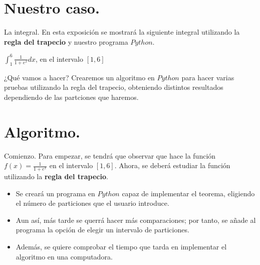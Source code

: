 \documentclass{beamer}
\begin{document}
  \section{Nuestro caso.}
  \begin{frame}
    \begin{block}{La integral.}
      En esta exposición se mostrará la siguiente integral utilizando la \textbf{regla del trapecio} y nuestro programa $Python$.\\
      \begin{center}
	$\int_{1}^{6}\frac{1}{1+e^x}dx$, en el intervalo $[1,6]$
      \end{center}
    \end{block}

    \begin{block}{¿Qué vamos a hacer?}
      Crearemos un algoritmo en \textbf{$Python$} para hacer varias pruebas utilizando la regla del trapecio, obteniendo distintos resultados dependiendo de las partciones que haremos.
    \end{block}
  \end{frame}
  \section{Algoritmo.}
  \begin{frame}
    \begin{block}{Comienzo.}
      Para empezar, se tendrá que observar que hace la función $f(x)=\frac{1}{1+e^{x}}$ en el intervalo $[1, 6]$.
      Ahora, se deberá estudiar la función utilizando la \textbf{regla del trapecio}.
    \end{block}
  \end{frame}
  \begin{frame}
    \begin{block}{ }
      \begin{itemize}
	\item Se creará un programa en $Python$ capaz de implementar el teorema, eligiendo el número de particiones que el usuario introduce.
	\pause
	\item Aun así, más tarde se querrá hacer más comparaciones; por tanto, se añade al programa la opción de elegir un intervalo de particiones.
	\pause
	\item Además, se quiere comprobar el tiempo que tarda en implementar el algoritmo en una computadora.
      \end{itemize}
    \end{block}
  \end{frame}
\end{document}
